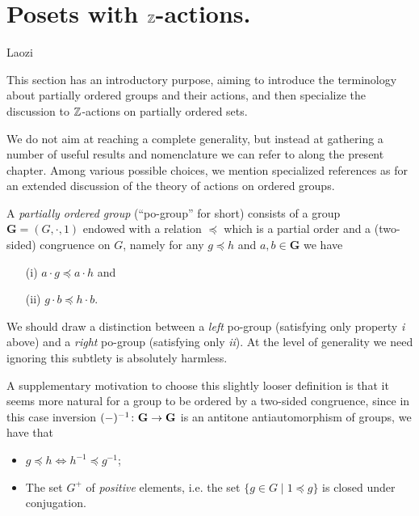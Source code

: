 \section{Posets with \texorpdfstring{$\mathbb{Z}$}{Z}\hyp{}actions.}
\epigraph{}{Laozi }
This section has an introductory purpose, aiming to introduce the terminology about partially ordered groups and their actions, and then specialize the discussion to $\mathbb{Z}$\hyp{}actions on partially ordered sets.

We do not aim at reaching a complete generality, but instead at gathering a number of useful results and nomenclature we can refer to along the present chapter. Among various possible choices, we mention specialized references as \cite{blyth2005lattices, glass1999partially, Fuch63} for an extended discussion of the theory of actions on ordered groups.
\begin{definition}
A \emph{partially ordered group} (``po\hyp{}group'' for short) consists of a group $\mathbf{G} = (G, \cdot,1)$ endowed with a relation $\preceq$ which is a partial order and a (two\hyp{}sided) congruence on $G$, namely for any $g\preceq h$ and $a,b\in \mathbf{G}$ we have 
\begin{itemize}
\item[(i)] $a\cdot g\preceq a\cdot h$ and
\item[(ii)] $g\cdot b\preceq h\cdot b$.
\end{itemize}
\end{definition}
\begin{remark}
We should draw a distinction between a \emph{left} po\hyp{}group (satisfying only property \emph{i} above) and a \emph{right} po\hyp{}group (satisfying only \emph{ii}). At the level of generality we need ignoring this subtlety is absolutely harmless.

A supplementary motivation to choose this slightly looser definition is that it seems more natural for a group to be ordered by a two\hyp{}sided congruence, since in this case inversion $(-)^{-1}\colon \textbf{G} \to \textbf{G}$ is an antitone antiautomorphism of groups, \ie we have that
\begin{itemize}
\item $g\preceq h \iff h^{-1}\preceq g^{-1}$;
\item The set $G^+$ of \emph{positive} elements, i.e. the set $\{g\in G\mid 1\preceq g\}$ is closed under conjugation.
\end{itemize}
\end{remark}
